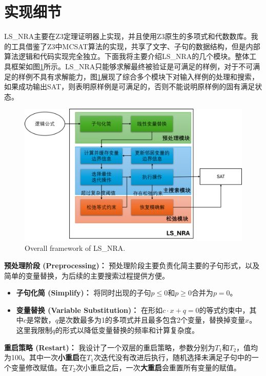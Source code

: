 \section{实现细节}
LS\_NRA主要在Z3定理证明器上实现，并且使用Z3原生的多项式和代数数库。我的工具借鉴了Z3中MCSAT算法的实现，共享了文字、子句的数据结构，但是内部算法逻辑和代码实现完全独立。下面我将主要介绍LS\_NRA的几个模块。整体工具框架如图\ref{fig:total}所示。LS\_NRA只能够求解最终被验证是可满足的样例，对于不可满足的样例不具有求解能力，图\ref{fig:total}展现了综合多个模块下对输入样例的处理和搜索，如果成功输出SAT，则表明原样例是可满足的，否则不能说明原样例的固有满足状态。

\begin{figure}[]
    \centering
    \includegraphics[width=0.9\columnwidth]{Img/structure.png}
     {Overall framework of LS\_NRA.}
    \label{fig:total}
\end{figure}

\textbf{预处理阶段 (Preprocessing)：} 预处理阶段主要负责化简主要的子句形式，以及简单的变量替换，为后续的主要搜索过程提供方便。
\begin{itemize}
    \item \textbf{子句化简 (Simplify)：} 将同时出现的子句$p \le 0$和$p \ge 0$合并为$p = 0$。
    \item \textbf{变量替换 (Variable Substitution)：} 在形如$c \cdot x + q = 0$的等式约束中，其中$c$是常数，$q$是次数最多为1的多项式并且最多包含2个变量，替换掉变量$x$。这里我限制$q$的形式以降低变量替换的频率和计算复杂度。
\end{itemize}

\textbf{重启策略 (Restart)：} 我设计了一个双层的重启策略，参数分别为$T_1$和$T_2$，值均为100。其中一次\textbf{小重启}在$T_1$次迭代没有改进后执行，随机选择未满足子句中的一个变量修改赋值。在$T_2$次小重启之后，一次\textbf{大重启}会重置所有变量的赋值。

